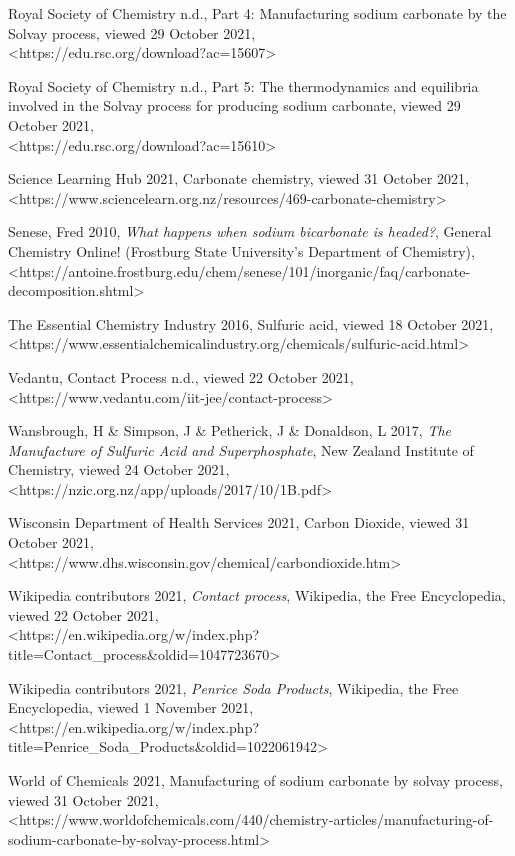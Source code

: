 \documentclass[12pt, a4paper]{article}
\begin{document}
Royal Society of Chemistry n.d., Part 4: Manufacturing sodium carbonate by the Solvay process, viewed 29 October 2021, \\ \textless{https://edu.rsc.org/download?ac=15607}\textgreater

Royal Society of Chemistry n.d., Part 5: The thermodynamics and equilibria involved in the Solvay process for producing sodium carbonate, viewed 29 October 2021, \\ \textless{https://edu.rsc.org/download?ac=15610}\textgreater

Science Learning Hub 2021, Carbonate chemistry, viewed 31 October 2021, \\ \textless{https://www.sciencelearn.org.nz/resources/469-carbonate-chemistry}\textgreater

Senese, Fred 2010, \emph{What happens when sodium bicarbonate is headed?}, General Chemistry Online! (Frostburg State University's Department of Chemistry), \\ \textless{https://antoine.frostburg.edu/chem/senese/101/inorganic/faq/carbonate-decomposition.shtml}\textgreater

The Essential Chemistry Industry 2016, Sulfuric acid, viewed 18 October 2021, \\ \textless{https://www.essentialchemicalindustry.org/chemicals/sulfuric-acid.html}\textgreater

Vedantu, Contact Process n.d., viewed 22 October 2021, \\ \textless{https://www.vedantu.com/iit-jee/contact-process}\textgreater

Wansbrough, H \& Simpson, J \& Petherick, J \& Donaldson, L 2017, \emph{The Manufacture of Sulfuric Acid and Superphosphate}, New Zealand Institute of Chemistry, viewed 24 October 2021, \\ \textless{https://nzic.org.nz/app/uploads/2017/10/1B.pdf}\textgreater

Wisconsin Department of Health Services 2021, Carbon Dioxide, viewed 31 October 2021, \\ \textless{https://www.dhs.wisconsin.gov/chemical/carbondioxide.htm}\textgreater

Wikipedia contributors 2021, \emph{Contact process}, Wikipedia, the Free Encyclopedia, viewed 22 October 2021, \\ \textless{https://en.wikipedia.org/w/index.php?title=Contact\_process\&oldid=1047723670}\textgreater

Wikipedia contributors 2021, \emph{Penrice Soda Products}, Wikipedia, the Free Encyclopedia, viewed 1 November 2021, \\ \textless{https://en.wikipedia.org/w/index.php?title=Penrice_Soda_Products&oldid=1022061942}\textgreater

World of Chemicals 2021, Manufacturing of sodium carbonate by solvay process, viewed 31 October 2021, \\ \textless{https://www.worldofchemicals.com/440/chemistry-articles/manufacturing-of-sodium-carbonate-by-solvay-process.html}\textgreater
\end{document}
